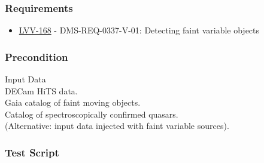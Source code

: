 \hypertarget{requirements-57}{%
\subsubsection{Requirements}\label{requirements-57}}

\begin{itemize}
\tightlist
\item
  \href{https://jira.lsstcorp.org/browse/LVV-168}{LVV-168} -
  DMS-REQ-0337-V-01: Detecting faint variable objects
\end{itemize}

\hypertarget{precondition-10}{%
\subsubsection{Precondition}\label{precondition-10}}

Input Data\\
DECam HiTS data.\\
Gaia catalog of faint moving objects.\\
Catalog of spectroscopically confirmed quasars.\\
(Alternative: input data injected with faint variable sources).

\hypertarget{test-script-57}{%
\subsubsection{Test Script}\label{test-script-57}}

